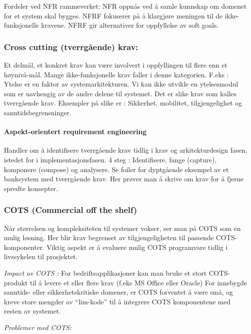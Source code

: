 Fordeler ved NFR rammeverket: NFR oppnås ved å samle kunnskap om domenet
for et system skal bygges. NFRF fokuserer på å klargjøre meningen til de
ikke-funksjonelle kravene. NFRF gir alternativer for oppfyllelse av soft
goals.

\subsubsection{Cross cutting (tverrgående) krav:}

Et delmål, et konkret krav kan være involvert i oppfyllingen til flere
enn et høynivå-mål. Mange ikke-funksjonelle krav faller i denne
kategorien. F.eks : Ytelse er en faktor av systemarkitekturen. Vi kan
ikke utvikle en ytelsesmodul som er uavhengig av de andre delene til
systemet. Det er slike krav som kalles tverrgående krav. Eksempler på
slike er : Sikkerhet, mobilitet, tilgjengelighet og
sanntidsbegrensninger.

\paragraph{Aspekt-orientert requirement engineering}

Handler om å identifisere tverrgående krav tidlig i krav og
arkitekturdesign fasen, istedet for i implementasjonsfasen. 4 steg :
Identifisere, fange (capture), komponere (compose) og analysere. Se
foiler for dyptgående eksempel av et banksystem med tverrgående krav.
Her prøver man å skrive om krav for å fjerne spredte konsepter.

\subsubsection{COTS (Commercial off the shelf)}

Når størrelsen og kompleksiteten til systemer vokser, ser man på COTS
som en mulig løsning. Her blir krav begrenset av tilgjengeligheten til
passende COTS-komponenter. Viktig aspekt er å evaluere mulig COTS
programvare tidlig i livssykelen til prosjektet.

\emph{Impact av COTS :} For bedriftsapplikasjoner kan man bruke et stort
COTS-produkt til å levere et eller flere krav (f.eks MS Office eller
Oracle) For innebygde sanntids- eller sikkerhetskritiske domener, er
COTS forventet å være små, og kreve store mengder av ``lim-kode'' til å
integrere COTS komponentene med resten av systemet.

\emph{Problemer med COTS:}

